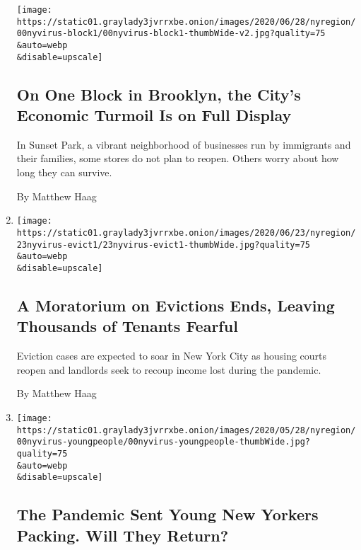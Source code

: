 \begin{enumerate}
  \texttt{[image: https://static01.graylady3jvrrxbe.onion/images/2020/06/28/nyregion/00nyvirus-block1/00nyvirus-block1-thumbWide-v2.jpg?quality=75\\\&auto=webp\\\&disable=upscale]}

  \hypertarget{on-one-block-in-brooklyn-the-citys-economic-turmoil-is-on-full-display}{%
  \subsection{On One Block in Brooklyn, the City's Economic Turmoil Is
  on Full
  Display}\label{on-one-block-in-brooklyn-the-citys-economic-turmoil-is-on-full-display}}

  In Sunset Park, a vibrant neighborhood of businesses run by immigrants
  and their families, some stores do not plan to reopen. Others worry
  about how long they can survive.

  By Matthew Haag
\item
  \href{/2020/06/22/nyregion/nyc-evictions-moratorium-coronavirus.html}{}

  \texttt{[image: https://static01.graylady3jvrrxbe.onion/images/2020/06/23/nyregion/23nyvirus-evict1/23nyvirus-evict1-thumbWide.jpg?quality=75\\\&auto=webp\\\&disable=upscale]}

  \hypertarget{a-moratorium-on-evictions-ends-leaving-thousands-of-tenants-fearful}{%
  \subsection{A Moratorium on Evictions Ends, Leaving Thousands of
  Tenants
  Fearful}\label{a-moratorium-on-evictions-ends-leaving-thousands-of-tenants-fearful}}

  Eviction cases are expected to soar in New York City as housing courts
  reopen and landlords seek to recoup income lost during the pandemic.

  By Matthew Haag
\item
  \href{/2020/06/19/nyregion/nyc-coronavirus-young-people.html}{}

  \texttt{[image: https://static01.graylady3jvrrxbe.onion/images/2020/05/28/nyregion/00nyvirus-youngpeople/00nyvirus-youngpeople-thumbWide.jpg?quality=75\\\&auto=webp\\\&disable=upscale]}

  \hypertarget{the-pandemic-sent-young-new-yorkers-packing-will-they-return}{%
  \subsection{The Pandemic Sent Young New Yorkers Packing. Will They
  Return?}\label{the-pandemic-sent-young-new-yorkers-packing-will-they-return}}


\end{enumerate}
